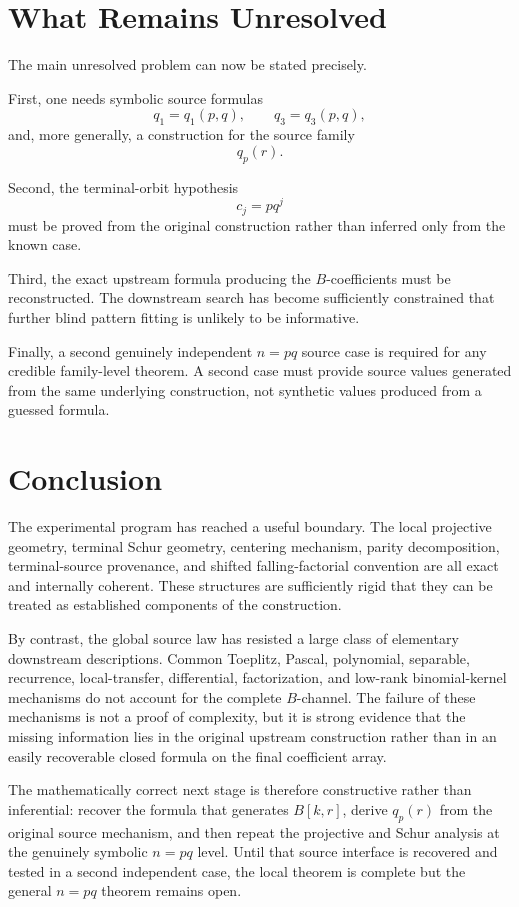 \documentclass[11pt]{article}
\begin{document}
\section{What Remains Unresolved}

The main unresolved problem can now be stated precisely.

First, one needs symbolic source formulas
\begin{equation}
    q_1=q_1(p,q),
    \qquad
    q_3=q_3(p,q),
\end{equation}
and, more generally, a construction for the source family
\begin{equation}
    q_p(r).
\end{equation}

Second, the terminal-orbit hypothesis
\begin{equation}
    c_j=pq^j
\end{equation}
must be proved from the original construction rather than inferred only from the known case.

Third, the exact upstream formula producing the $B$-coefficients must be reconstructed. The downstream search has become sufficiently constrained that further blind pattern fitting is unlikely to be informative.

Finally, a second genuinely independent $n=pq$ source case is required for any credible family-level theorem. A second case must provide source values generated from the same underlying construction, not synthetic values produced from a guessed formula.

\section{Conclusion}

The experimental program has reached a useful boundary. The local projective geometry, terminal Schur geometry, centering mechanism, parity decomposition, terminal-source provenance, and shifted falling-factorial convention are all exact and internally coherent. These structures are sufficiently rigid that they can be treated as established components of the construction.

By contrast, the global source law has resisted a large class of elementary downstream descriptions. Common Toeplitz, Pascal, polynomial, separable, recurrence, local-transfer, differential, factorization, and low-rank binomial-kernel mechanisms do not account for the complete $B$-channel. The failure of these mechanisms is not a proof of complexity, but it is strong evidence that the missing information lies in the original upstream construction rather than in an easily recoverable closed formula on the final coefficient array.

The mathematically correct next stage is therefore constructive rather than inferential: recover the formula that generates $B[k,r]$, derive $q_p(r)$ from the original source mechanism, and then repeat the projective and Schur analysis at the genuinely symbolic $n=pq$ level. Until that source interface is recovered and tested in a second independent case, the local theorem is complete but the general $n=pq$ theorem remains open.
\end{document}
